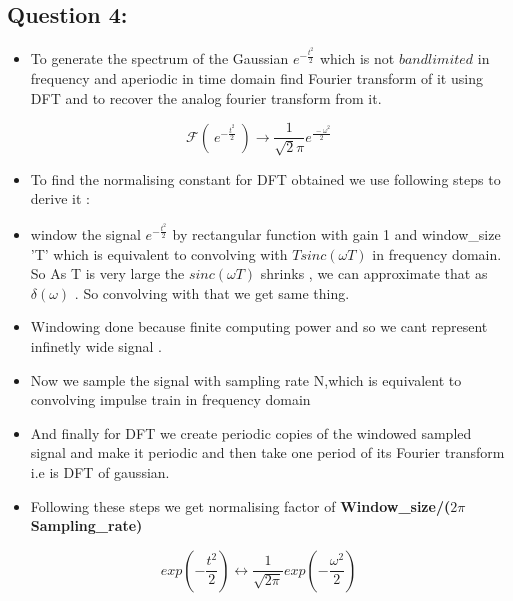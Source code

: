 \documentclass[11pt, a4paper]{article}
\begin{document}
\subsection{Question 4:}\label{question-4}

\begin{itemize}

\item
  To generate the spectrum of the Gaussian \(e^{-\frac{t^{2}}{ 2}}\)
  which is not \(bandlimited\) in frequency and aperiodic in time domain
  find Fourier transform of it using DFT and to recover the analog
  fourier transform from it.
\end{itemize}

\begin{equation}
 \mathscr{F} ( \ e^{-\frac{t^{2}}{2}} \ ) \to \frac{1}{\sqrt 2\pi} e^{\frac{\ - \omega ^{2}}{2}}
\end{equation}

\begin{itemize}

\item
  To find the normalising constant for DFT obtained we use following
  steps to derive it :
\item
  window the signal \(e^{-\frac{t^{2}}{2}}\) by rectangular function
  with gain 1 and window\_size 'T' which is equivalent to convolving
  with \(Tsinc(\omega T)\) in frequency domain. So As T is very large
  the \(sinc(\omega T) \) shrinks , we can approximate that as
  \(\delta(\omega)\) . So convolving with that we get same thing.
\item
  Windowing done because finite computing power and so we cant represent
  infinetly wide signal .
\item
  Now we sample the signal with sampling rate N,which is equivalent to
  convolving impulse train in frequency domain
\item
  And finally for DFT we create periodic copies of the windowed sampled
  signal and make it periodic and then take one period of its Fourier
  transform i.e is DFT of gaussian.
\item
  Following these steps we get normalising factor of
  \textbf{Window\_size/(\(2 \pi \ \)Sampling\_rate)}
\end{itemize}

\begin{equation}
exp({-\frac{t^2}{2}}) \longleftrightarrow \frac{1}{\sqrt{2\pi}}exp({-\frac{\omega^2}{2}})
\end{equation}
\end{document}
